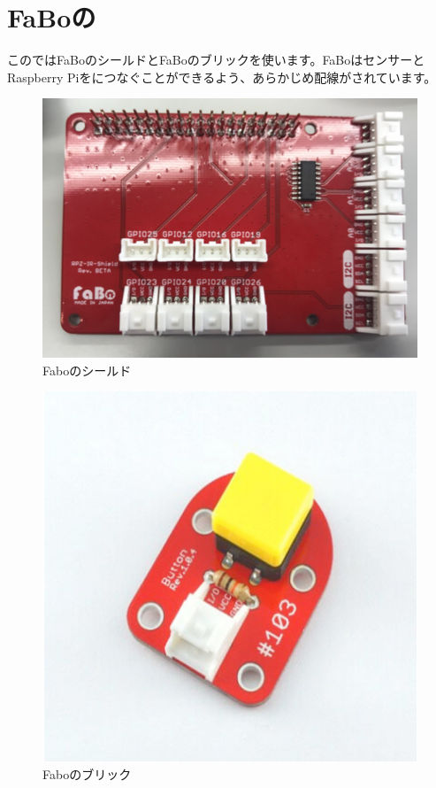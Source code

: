 \section{FaBoの}
このではFaBoのシールドとFaBoのブリックを使います。FaBoはセンサーとRaspberry Piをにつなぐことができるよう、あらかじめ配線がされています。
\begin{center}
  \begin{minipage}[b]{0.45\linewidth}
    \begin{figure}[H]
      \centering
      \includegraphics[keepaspectratio, scale=0.6]{images/chap05/text05-img004.png}
      \caption{Faboのシールド}
      \label{fig4}
    \end{figure}
  \end{minipage}
  \begin{minipage}[b]{0.45\linewidth}
    \begin{figure}[H]
      \centering
      \includegraphics[keepaspectratio, scale=0.6]{images/chap05/text05-img005.png}
      \caption{Faboのブリック}
      \label{fig5}
    \end{figure}
  \end{minipage}
\end{center}
